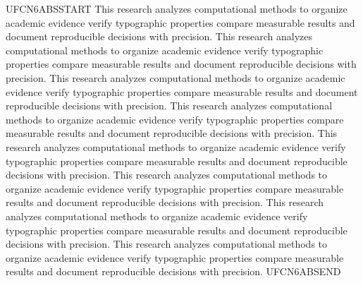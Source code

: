 UFCN6ABSSTART This research analyzes computational methods to organize academic evidence verify typographic properties compare measurable results and document reproducible decisions with precision. This research analyzes computational methods to organize academic evidence verify typographic properties compare measurable results and document reproducible decisions with precision. This research analyzes computational methods to organize academic evidence verify typographic properties compare measurable results and document reproducible decisions with precision. This research analyzes computational methods to organize academic evidence verify typographic properties compare measurable results and document reproducible decisions with precision. This research analyzes computational methods to organize academic evidence verify typographic properties compare measurable results and document reproducible decisions with precision. This research analyzes computational methods to organize academic evidence verify typographic properties compare measurable results and document reproducible decisions with precision. This research analyzes computational methods to organize academic evidence verify typographic properties compare measurable results and document reproducible decisions with precision. This research analyzes computational methods to organize academic evidence verify typographic properties compare measurable results and document reproducible decisions with precision. UFCN6ABSEND

